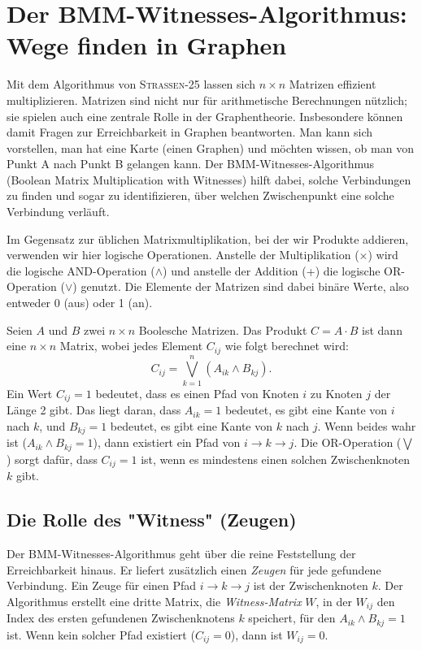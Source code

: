\documentclass{scrartcl}
\numberwithin{equation}{section}
\begin{document}
\section{Der BMM-Witnesses-Algorithmus: Wege finden in Graphen}
Mit dem Algorithmus von \textsc{Strassen-25} lassen sich $n \times n$ Matrizen effizient multiplizieren. Matrizen sind nicht nur für arithmetische Berechnungen nützlich; sie spielen auch eine zentrale Rolle in der Graphentheorie. Insbesondere können damit Fragen zur Erreichbarkeit in Graphen beantworten. Man kann sich vorstellen, man hat eine Karte (einen Graphen) und möchten wissen, ob man von Punkt A nach Punkt B gelangen kann. Der BMM-Witnesses-Algorithmus (Boolean Matrix Multiplication with Witnesses) hilft dabei, solche Verbindungen zu finden und sogar zu identifizieren, über welchen Zwischenpunkt eine solche Verbindung verläuft.

Im Gegensatz zur üblichen Matrixmultiplikation, bei der wir Produkte addieren, verwenden wir hier logische Operationen. Anstelle der Multiplikation ($\times$) wird die logische AND-Operation ($\land$) und anstelle der Addition (+) die logische OR-Operation ($\lor$) genutzt. Die Elemente der Matrizen sind dabei binäre Werte, also entweder 0 (aus) oder 1 (an).

Seien $A$ und $B$ zwei $n \times n$ Boolesche Matrizen. Das Produkt $C = A \cdot B$ ist dann eine $n \times n$ Matrix, wobei jedes Element $C_{ij}$ wie folgt berechnet wird:
\begin{equation}
	\label{formula:bmm}
	C_{ij} = \bigvee_{k=1}^{n} (A_{ik} \land B_{kj}).
\end{equation}
Ein Wert $C_{ij} = 1$ bedeutet, dass es einen Pfad von Knoten $i$ zu Knoten $j$ der Länge 2 gibt. Das liegt daran, dass $A_{ik} = 1$ bedeutet, es gibt eine Kante von $i$ nach $k$, und $B_{kj} = 1$ bedeutet, es gibt eine Kante von $k$ nach $j$. Wenn beides wahr ist ($A_{ik} \land B_{kj} = 1$), dann existiert ein Pfad von $i \to k \to j$. Die OR-Operation ($\bigvee$) sorgt dafür, dass $C_{ij} = 1$ ist, wenn es mindestens einen solchen Zwischenknoten $k$ gibt.

\subsection{Die Rolle des "Witness" (Zeugen)}
Der BMM-Witnesses-Algorithmus geht über die reine Feststellung der Erreichbarkeit hinaus. Er liefert zusätzlich einen \textit{Zeugen} für jede gefundene Verbindung. Ein Zeuge für einen Pfad $i \to k \to j$ ist der Zwischenknoten $k$. Der Algorithmus erstellt eine dritte Matrix, die \textit{Witness-Matrix} $W$, in der $W_{ij}$ den Index des ersten gefundenen Zwischenknotens $k$ speichert, für den $A_{ik} \land B_{kj} = 1$ ist. Wenn kein solcher Pfad existiert ($C_{ij} = 0$), dann ist $W_{ij} = 0$.
\end{document}
